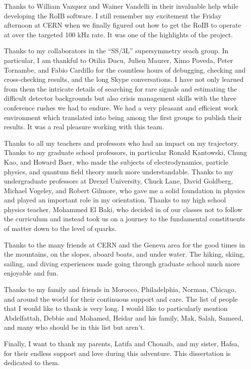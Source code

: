 Thanks to William Vazquez and Wainer Vandelli in their invaluable help while developing the RoIB software.
I still remember my excitement the Friday afternoon at CERN when we finally figured out how to get the RoIB to operate at 
over the targeted 100 kHz rate. It was one of the highlights of the project.

Thanks to my collaborators in the ``SS/3L'' supersymmetry seach group. In particular, I am thankful to 
Otilia Ducu, Julien Maurer, Ximo Poveda, Peter Tornambe, and Fabio Cardillo for the countless hours of debugging, 
checking and cross-checking results, and the long Skype conversations. 
I have not only learned from them the intricate details of searching for rare signals and estimating 
the difficult detector backgrounds but also crisis management skills with the three conference rushes we had to endure. 
We had a very pleasant and efficient work environment which translated into being among the first groups to 
publish their results.
It was a real pleasure working with this team.

Thanks to all my teachers and professors who had an impact on my trajectory.
Thanks to my graduate school professors, 
in particular Ronald Kantowski, Chung Kao, and Howard Baer, who made the subjects of 
electrodynamics, particle physics, and quantum field theory much more understandable.
Thanks to my undergraduate professors at Drexel University,
Chuck Lane, David Goldberg, Michael Vogeley, and Robert Gilmore, who gave me a solid foundation
in physics and played an important role in my orientation.
Thanks to my high school physics teacher, Mohammed El Baki, who 
decided in of our classes not to follow 
the curriculum and instead took us on a journey to the fundamental 
constituents of matter down to the level of quarks. 

Thanks to the many friends at CERN and the Geneva area for the good times in the mountains, on the slopes, aboard boats, 
and under water. The hiking, skiing, sailing, and diving experiences made going through graduate school much more enjoyable and fun.

Thanks to my family and friends in Morocco, Philadelphia, Norman, Chicago, and around the world for their continuous support and care. 
The list of people that I would like to thank is very long.
I would like to particularly mention Abdelfattah, Debbie and Mohamed, 
Heidar and his family, Mak, Salah, Sameed, and many who should be in this list but aren't. 

Finally, I want to thank my parents, Latifa and Chouaib, and my sister, Hafsa, for their  
endless support and love during this adventure. This dissertation is dedicated to them.






